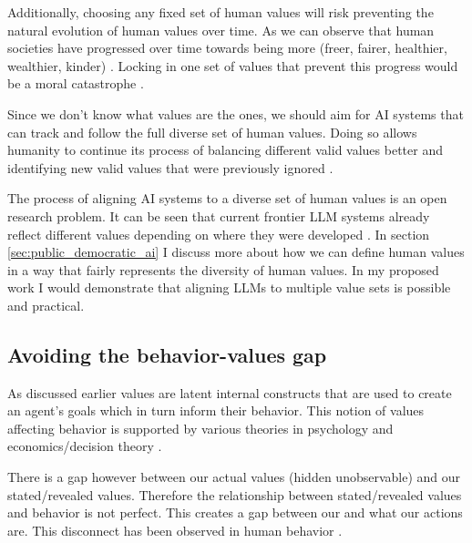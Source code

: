 Additionally, choosing any fixed set of human values will risk preventing the natural evolution of human values over time. As we can observe that human societies have progressed over time towards being more  (freer, fairer, healthier, wealthier, kinder) \cite{pinkerBetterAngelsOur2012,berlinCrookedTimberHumanity2012,singerExpandingCircleEthics1981}. Locking in one set of values that prevent this progress would be a moral catastrophe \cite{bostromSuperintelligencePathsDangers2014a}.

Since we don't know what values are the  ones, we should aim for AI systems that can track and follow the full diverse set of human values. Doing so allows humanity to continue its process of balancing different valid values better and identifying new valid values that were previously ignored \cite{rossRightGood2002}.


The process of aligning AI systems to a diverse set of human values is an open research problem. It can be seen that current frontier LLM systems already reflect different values depending on where they were developed \cite{santurkarWhoseOpinionsLanguage2023,buylLargeLanguageModels2025}. In section \ref{sec:public_democratic_ai} I discuss more about how we can define human values in a way that fairly represents the diversity of human values. In my proposed work I would demonstrate that aligning LLMs to multiple value sets is possible and practical.

\subsection{Avoiding the behavior-values gap}

As discussed earlier values are latent internal constructs that are used to create an agent's goals which in turn inform their behavior. This notion of values affecting behavior is supported by various theories in psychology \cite{schwartzOverviewSchwartzTheory2012,rokeachNatureHumanValues1973} and economics/decision theory \cite{neumannTheoryGamesEconomic1944,savageFoundationsStatistics1954,varianIntermediateMicroeconomicsModern2010}.

There is a gap however between our actual values (hidden unobservable) and our stated/revealed values. Therefore the relationship between stated/revealed values and behavior is not perfect. This creates a gap between our  and what our actions are. This disconnect has been observed in human behavior \cite{kollmussMindGapWhy2002,gabrielArtificialIntelligenceValues2020}.

